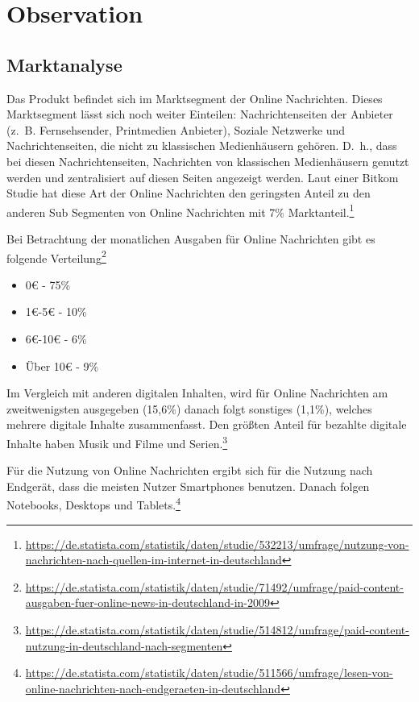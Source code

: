 
\section{Observation}

\subsection{Marktanalyse}

Das Produkt befindet sich im Marktsegment der Online Nachrichten. Dieses Marktsegment lässt sich noch weiter Einteilen: Nachrichtenseiten der Anbieter (z.~B. Fernsehsender, Printmedien Anbieter), Soziale Netzwerke und Nachrichtenseiten, die nicht zu klassischen Medienhäusern gehören. D.~h., dass bei diesen Nachrichtenseiten, Nachrichten von klassischen Medienhäusern genutzt werden und zentralisiert auf diesen Seiten angezeigt werden. Laut einer Bitkom Studie hat diese Art der Online Nachrichten den geringsten Anteil zu den anderen Sub Segmenten von Online Nachrichten mit 7\% Marktanteil.\footnote{\url{https://de.statista.com/statistik/daten/studie/532213/umfrage/nutzung-von-nachrichten-nach-quellen-im-internet-in-deutschland}}

Bei Betrachtung der monatlichen Ausgaben für Online Nachrichten gibt es folgende Verteilung\footnote{\url{https://de.statista.com/statistik/daten/studie/71492/umfrage/paid-content-ausgaben-fuer-online-news-in-deutschland-in-2009}}

\begin{itemize}
  \item 0€ - 75\%
  \item 1€-5€ - 10\%
  \item 6€-10€ - 6\%
  \item Über 10€ - 9\%
\end{itemize}

Im Vergleich mit anderen digitalen Inhalten, wird für Online Nachrichten am zweitwenigsten ausgegeben (15,6\%) danach folgt sonstiges (1,1\%), welches mehrere digitale Inhalte zusammenfasst. Den größten Anteil für bezahlte digitale Inhalte haben Musik und Filme und Serien.\footnote{\url{https://de.statista.com/statistik/daten/studie/514812/umfrage/paid-content-nutzung-in-deutschland-nach-segmenten}}

Für die Nutzung von Online Nachrichten ergibt sich für die Nutzung nach Endgerät, dass die meisten Nutzer Smartphones benutzen. Danach folgen Notebooks, Desktops und Tablets.\footnote{\url{https://de.statista.com/statistik/daten/studie/511566/umfrage/lesen-von-online-nachrichten-nach-endgeraeten-in-deutschland}}

